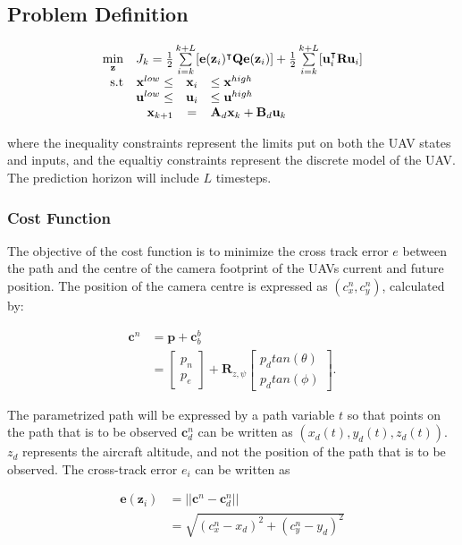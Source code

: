 \subsection*{Problem Definition}

\begin{equation}
	\begin{array}{rrclcl}
		\displaystyle \min_{\mathbf{z}} & \multicolumn{3}{l}{J_k = \frac{1}{2} \sum\limits_{i=k}^{k+L} [\mathbf{e}(\mathbf{z}_i)^\intercal \mathbf{Q} \mathbf{e}(\mathbf{z}_i)] + \frac{1}{2} \sum\limits_{i=k}^{k+L} [\mathbf{u}_i^\intercal \mathbf{R} \mathbf{u}_i]}\\
		\textrm{s.t}
		& \mathbf{x}^{low} \leq & \mathbf{x}_i & \leq \mathbf{x}^{high} \\
		& \mathbf{u}^{low} \leq & \mathbf{u}_i & \leq \mathbf{u}^{high} \\
		& \displaystyle \mathbf{x}_{k+1} & = & \mathbf{A}_d \mathbf{x}_k + \mathbf{B}_d \mathbf{u}_k
	\end{array}
\end{equation}

where the inequality constraints represent the limits put on both the UAV states and inputs, and the equaltiy constraints represent the discrete model of the UAV. The prediction horizon will include $L$ timesteps.


\subsubsection*{Cost Function}

The objective of the cost function is to minimize the cross track error $e$ between the path and the centre of the camera footprint of the UAVs current and future position. The position of the camera centre is expressed as $(c_x^n, c_y^n)$, calculated by:

\begin{equation}
\begin{split}
	\mathbf{c}^n & = \mathbf{p} + \mathbf{c}_b^b \\
	& =
	\begin{bmatrix}
		p_n \\ p_e
	\end{bmatrix}
	+ \mathbf{R}_{z,\psi}
	\begin{bmatrix}
		p_d tan(\theta) \\ p_d tan(\phi)
	\end{bmatrix}.
\end{split}
\end{equation}

The parametrized path will be expressed by a path variable $t$ so that points on the path that is to be observed $\mathbf{c}_d^n$ can be written as $(x_d(t), y_d(t), z_d(t))$. $z_d$ represents the aircraft altitude, and not the position of the path that is to be observed. The cross-track error $e_i$ can be written as

\begin{equation}
\begin{split}
	\mathbf{e}(\mathbf{z}_i) & = ||\mathbf{c}^n - \mathbf{c}^n_d|| \\
	& = \sqrt{(c_x^n - x_d)^2 + (c_y^n - y_d)^2}
\end{split}
\end{equation}